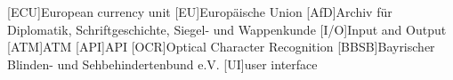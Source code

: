 \begin{acronym}[ECU]
[ECU]{European currency unit}
[EU]{Europäische Union}
[AfD]{Archiv für Diplomatik, Schriftgeschichte, Siegel- und Wappenkunde}
[I/O]{Input and Output}
[ATM]{ATM}
[API]{API}
[OCR]{Optical Character Recognition}
[BBSB]{Bayrischer Blinden- und Sehbehindertenbund e.V.}
[UI]{user interface}
\end{acronym}

